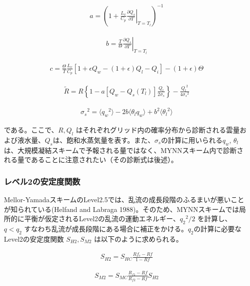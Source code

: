 \begin{eqnarray}a=\left(1+\frac{L_v}{C_p}\left.\frac{\partial Q_s}{\partial T}\right|_{T=T_l}\right)^{-1}\end{eqnarray}

\begin{eqnarray}b=\frac{T}{\Theta}\left.\frac{\partial Q_s}{\partial T}\right|_{T=T_l}\end{eqnarray}

\begin{eqnarray}c=\frac{\Theta}{T}\frac{L_v}{C_p}\left[1+\epsilon Q_w-(1+\epsilon)Q_l-Q_i\right]-(1+\epsilon)\Theta\end{eqnarray}

\begin{eqnarray}\tilde{R}=R\left\{1-a\left[Q_w-Q_s(T_l)\right]\frac{Q_l}{2\sigma_s}\right\}-\frac{{Q_l}^2}{4{\sigma_s}^2}\end{eqnarray}

\begin{eqnarray}{\sigma_s}^2=\langle {q_w}^2 \rangle -2b \langle \theta_l q_w \rangle + b^2\langle {\theta_l}^2 \rangle\end{eqnarray}

である。ここで、\(R,Q_l\)
はそれぞれグリッド内の確率分布から診断される雲量および液水量、\(Q_s\)は、飽和水蒸気量を表す。また、\(\sigma_s\)の計算に用いられる\(q_w\),
\(\theta_l\)は、大規模凝結スキームで予報される量ではなく、MYNNスキーム内で診断される量であることに注意されたい（その診断式は後述）。

\hypertarget{ux30ecux30d9ux30eb2ux306eux5b89ux5b9aux5ea6ux95a2ux6570}{%
\subsubsection{レベル2の安定度関数}\label{ux30ecux30d9ux30eb2ux306eux5b89ux5b9aux5ea6ux95a2ux6570}}

Mellor-YamadaスキームのLevel2.5では、乱流の成長段階のふるまいが悪いことが知られている(Helfand
and Labraga
1988)。そのため、MYNNスキームでは局所的に平衡が仮定されるLevel2の乱流の運動エネルギー、\({q_2}^2/2\)
を計算し、\(q<q_2\)
すなわち乱流が成長段階にある場合に補正をかける。\(q_2\)の計算に必要なLevel2の安定度関数
\(S_{H2},S_{M2}\) は以下のように求められる。

\begin{eqnarray}S_{H2}=S_{HC}\frac{Rf_c-Rf}{1-Rf}\end{eqnarray}

\begin{eqnarray}S_{M2}=S_{MC}\frac{R_{f1}-Rf}{R_{f2}-Rf}S_{H2}\end{eqnarray}

